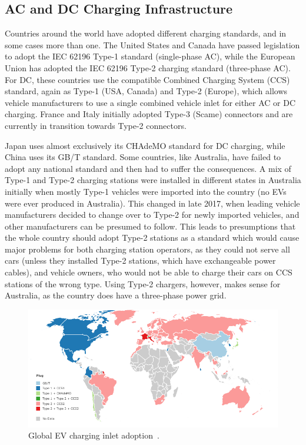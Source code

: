 \subsection{AC and DC Charging Infrastructure}
Countries around the world have adopted different charging standards, and in some cases more than one. The United States and Canada have passed legislation to adopt the IEC 62196 Type-1 standard (single-phase AC), while the European Union has adopted the IEC 62196 Type-2 charging standard (three-phase AC). For DC, these countries use the compatible Combined Charging System (CCS) standard, again as Type-1 (USA, Canada) and Type-2 (Europe), which allows vehicle manufacturers to use a single combined vehicle inlet for either AC or DC charging. France and Italy initially adopted Type-3 (Scame) connectors and are currently in transition towards Type-2 connectors. 

Japan uses almost exclusively its CHAdeMO standard for DC charging, while China uses its GB/T standard. Some countries, like Australia, have failed to adopt any national standard and then had to suffer the consequences. A mix of Type-1 and Type-2 charging stations were installed in different states in Australia initially when mostly Type-1 vehicles were imported into the country (no EVs were ever produced in Australia). This changed in late 2017, when leading vehicle manufacturers decided to change over to Type-2 for newly imported vehicles, and other manufacturers can be presumed to follow. This leads to presumptions that the whole country should adopt Type-2 stations as a standard which would cause major problems for both charging station operators, as they could not serve all cars (unless they installed Type-2 stations, which have exchangeable power cables), and vehicle owners, who would not be able to charge their cars on CCS stations of the wrong type. Using Type-2 chargers, however, makes sense for Australia, as the country does have a three-phase power grid.

\begin{figure}[H]
	\centering
	\includegraphics[width=\linewidth]{map}
	\caption[Global EV charging inlet adoption]{Global EV charging inlet adoption~\cite{plugshare_plugshare_nodate}.}
	\label{fig:10:map}
\end{figure}

